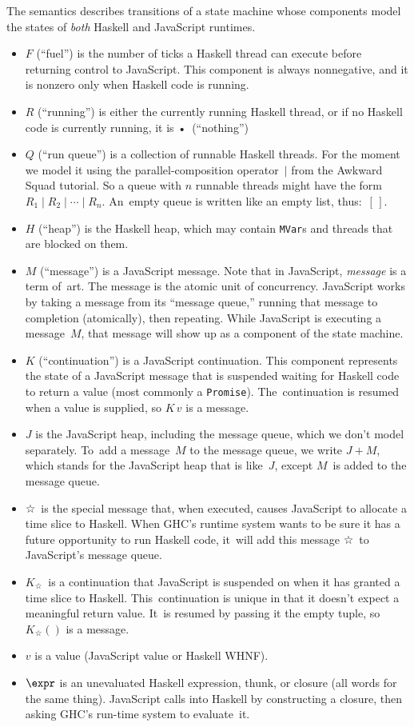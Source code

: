 \documentclass{article}
\newcommand\slicemessage{\mbox{☆}}
\newcommand\slicecont{\ensuremath{K_{☆}}}
\newcommand\notrunning{\mbox{•}}
\newcommand\emptylist{\ensuremath{[\,]}}
\begin{document}
The semantics describes transitions of a state machine whose
components model the states of \emph{both} Haskell and JavaScript runtimes.
\begin{itemize}
\item
  $F$ (``fuel'') is the number of ticks a Haskell thread can
  execute before returning control to JavaScript. This component is
  always nonnegative, and it is
  nonzero only when Haskell code is running.
\item
  $R$ (``running'') is either the currently running Haskell
  thread, or if no Haskell code is currently running, it is \notrunning\ (``nothing'')
\item
  $Q$ (``run queue'') is a collection of runnable Haskell threads.
  For the moment we model it using the parallel-composition
  operator~$\mid$ from the Awkward Squad tutorial.
  So a queue with $n$ runnable threads might have the form $R_1 \mid
  R_2 \mid \cdots \mid R_n$.
  An~empty queue is written like an empty list, thus:~\emptylist.
\item
  $H$ (``heap'') is the Haskell heap, which may contain
  \texttt{MVar}s and threads that are blocked on them.
\item
$M$ (``message'') is a JavaScript message.
Note that in JavaScript,  \emph{message} is a term of~art.
The message is the atomic unit of concurrency.
JavaScript works by taking a message from its ``message queue,''
running that message to completion (atomically),
then repeating.
While JavaScript is executing a message~$M$, that message will show up
as a component of the state machine.
\item
$K$ (``continuation'') is a JavaScript continuation.
This component represents the state of a JavaScript message that is
suspended waiting for Haskell code to return a value (most commonly a
\texttt{Promise}). 
The~continuation is resumed when a value is supplied, so
$K\,v$ is a message.
\item
$J$ is the JavaScript heap, including the message queue, which we
don't model separately.
To~add a message~$M$ to the message queue, we write
$J+M$, which stands for the JavaScript heap that is like~$J$, except
$M$~is added to the message queue.
\item
\slicemessage\ is the special message that, when executed, causes JavaScript
to allocate a time slice to Haskell.
When GHC's runtime system wants to be sure it has a future opportunity
to run Haskell code, it~will add this message \slicemessage\ to
JavaScript's message queue.
\item
\slicecont\ is a continuation that JavaScript is suspended on when
it has granted a time slice to Haskell.
This~continuation is unique in that it doesn't expect a meaningful
return value. 
It~is resumed by passing it the empty tuple, so $\slicecont()$ is a message.
\item
$v$ is a value (JavaScript value or Haskell WHNF).
\item
$\expr$ is an unevaluated Haskell expression, thunk, or closure (all words for the same
thing).
JavaScript calls into Haskell by constructing a closure, then asking
GHC's run-time system to evaluate~it.
\end{itemize}
\end{document}
